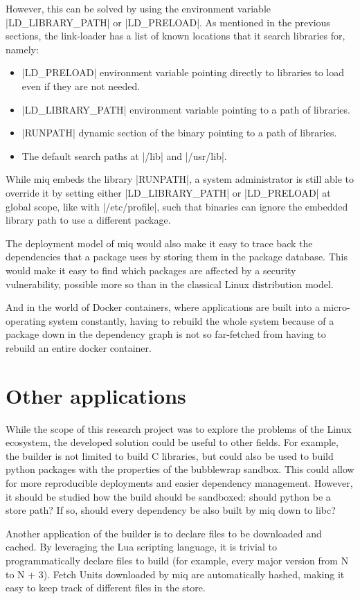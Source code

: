 However, this can be solved by using the environment
variable |LD_LIBRARY_PATH| or |LD_PRELOAD|. As mentioned in the previous
sections, the link-loader has a list of known locations that
it search libraries for, namely:

\begin{itemize}
    \item |LD_PRELOAD| environment variable pointing
    directly to libraries to load even if they are not
    needed.
    \item |LD_LIBRARY_PATH| environment variable pointing to
    a path of libraries.
    \item |RUNPATH| dynamic section of the binary pointing
    to a path of libraries.
    \item The default search paths at |/lib| and |/usr/lib|.
\end{itemize}

While miq embeds the library |RUNPATH|, a system
administrator is still able to override it by setting either
|LD_LIBRARY_PATH| or |LD_PRELOAD| at global scope, like with
|/etc/profile|, such that binaries can ignore the embedded
library path to use a different package.

The deployment model of miq would also make it easy to trace
back the dependencies that a package uses by storing them in
the package database. This would make it easy to find which
packages are affected by a security vulnerability, possible
more so than in the classical Linux distribution model.

And in the world of Docker containers, where applications
are built into a micro-operating system constantly, having
to rebuild the whole system because of a package down in the
dependency graph is not so far-fetched from having to
rebuild an entire docker container.

\section{Other applications}

While the scope of this research project was to explore the
problems of the Linux ecosystem, the developed solution
could be useful to other fields. For example, the builder is
not limited to build C libraries, but could also be used to
build python packages with the properties of the bubblewrap
sandbox. This could allow for more reproducible deployments
and easier dependency management. However, it should be
studied how the build should be sandboxed: should python be
a store path? If so, should every dependency be also built
by miq down to libc?

Another application of the builder is to declare files to be
downloaded and cached. By leveraging the Lua scripting
language, it is trivial to programmatically declare files to
build (for example, every major version from N to N + 3).
Fetch Units downloaded by miq are automatically hashed,
making it easy to keep track of different files in the store.
